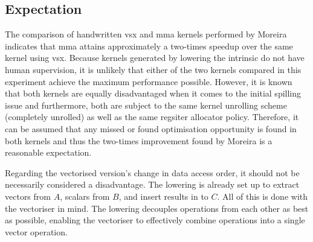 \documentclass[\main/thesis.tex]{subfiles}
\begin{document}
\subsection{Expectation}
The comparison of handwritten \gls{vsx} and \gls{mma} kernels performed by Moreira \etal indicates that \gls{mma} attains approximately a two-times speedup over the same kernel using \gls{vsx}.
Because kernels generated by lowering the  intrinsic do not have human supervision, it is unlikely that either of the two kernels compared in this experiment achieve the maximum performance possible.
However, it is known that both kernels are equally disadvantaged when it comes to the initial spilling issue and furthermore, both are subject to the same kernel unrolling scheme (\ie completely unrolled) as well as the same regsiter allocator policy.
Therefore, it can be assumed that any missed or found optimisation opportunity is found in both kernels and thus the two-times improvement found by Moreira \etal is a reasonable expectation.

Regarding the vectorised version's change in data access order, it should not be necessarily considered a disadvantage.
The lowering is already set up to extract vectors from $A$, scalars from $B$, and insert results in to $C$.
All of this is done with the vectoriser in mind.
The lowering decouples operations from each other as best as possible, enabling the vectoriser to effectively combine operations into a single vector operation.
\end{document}

